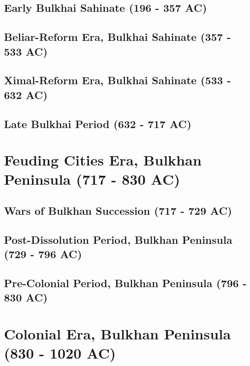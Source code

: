 	\subsection{Early Bulkhai Sahinate (196 - 357 AC)}
	\subsection{Beliar-Reform Era, Bulkhai Sahinate (357 - 533 AC)}
	\subsection{Ximal-Reform Era, Bulkhai Sahinate (533 - 632 AC)}
	\subsection{Late Bulkhai Period (632 - 717 AC)}
\section{Feuding Cities Era, Bulkhan Peninsula (717 - 830 AC)}
	\subsection{Wars of Bulkhan Succession (717 - 729 AC)}
	\subsection{Post-Dissolution Period, Bulkhan Peninsula (729 - 796 AC)}
	\subsection{Pre-Colonial Period, Bulkhan Peninsula (796 - 830 AC)}
\section{Colonial Era, Bulkhan Peninsula (830 - 1020 AC)}

		
		
		
		
